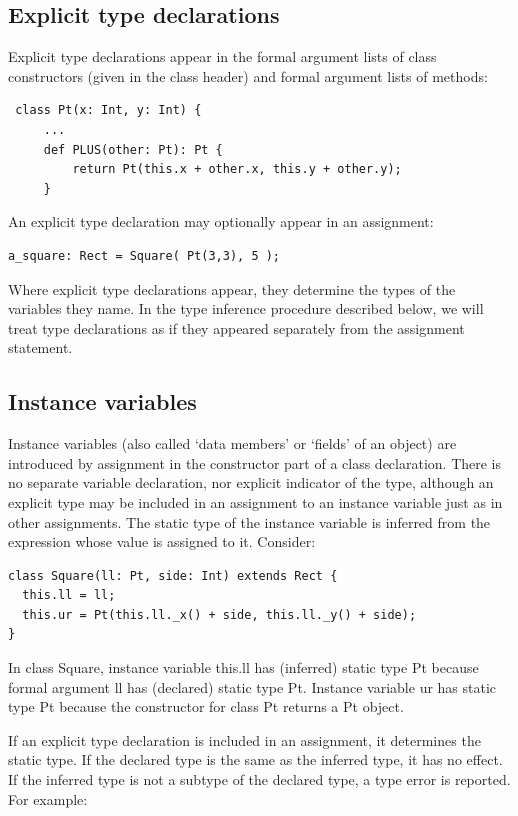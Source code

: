 \documentclass[11pt]{article}
\begin{document}
\subsection{Explicit type declarations}

Explicit type declarations appear in the formal argument lists of
class constructors (given in the class header) and formal argument
lists of methods: 

\begin{verbatim}
 class Pt(x: Int, y: Int) {
     ...  
     def PLUS(other: Pt): Pt {
         return Pt(this.x + other.x, this.y + other.y); 
     }
\end{verbatim}

An explicit type declaration may optionally appear in an assignment: 

\begin{verbatim}
a_square: Rect = Square( Pt(3,3), 5 );
\end{verbatim}

Where explicit type declarations appear, they determine the types of
the variables they name.  In the type inference procedure described
below, we will treat type declarations as if they appeared separately
from the assignment statement. 

\subsection{Instance variables}

Instance variables (also called `data members' or `fields' of an
object)  are introduced by assignment in the constructor part
of a class declaration.  There is no separate variable declaration,
nor explicit indicator of the type, although an explicit type may be
included in an assignment to an instance variable just as in other
assignments.  The static type of the
instance variable is 
inferred from the expression whose value is assigned to it.  Consider: 

\begin{verbatim}
class Square(ll: Pt, side: Int) extends Rect {
  this.ll = ll;
  this.ur = Pt(this.ll._x() + side, this.ll._y() + side);
}
\end{verbatim}

In class Square, instance variable this.ll  has (inferred) static type Pt because
formal argument ll has (declared) static type Pt.  Instance variable
ur has static type Pt because the constructor for class Pt returns 
a Pt object. 

If an explicit type declaration is included in an assignment, it
determines the static type.  If the declared type is the same as the
inferred type, it has no effect.  If the inferred type is not a
subtype of the declared type, a type error is reported.   For example: 
\end{document}
